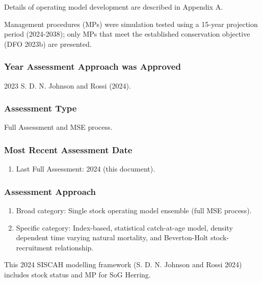 \documentclass[11pt]{book}
\begin{document}
Details of operating model development are described in Appendix A.

Management procedures (MPs) were simulation tested using a 15-year projection period (2024-2038); only MPs that meet the established conservation objective (DFO 2023b) are presented.

\hypertarget{year-assessment-approach-was-approved}{%
\subsubsection*{Year Assessment Approach was Approved}\label{year-assessment-approach-was-approved}}

2023 S. D. N. Johnson and Rossi (2024).

\hypertarget{assessment-type}{%
\subsubsection*{Assessment Type}\label{assessment-type}}

Full Assessment and MSE process.

\hypertarget{most-recent-assessment-date}{%
\subsubsection*{Most Recent Assessment Date}\label{most-recent-assessment-date}}
\begin{enumerate}
\def\labelenumi{\arabic{enumi}.}

\item
  Last Full Assessment: 2024 (this document).
\end{enumerate}
\hypertarget{assessment-approach}{%
\subsubsection*{Assessment Approach}\label{assessment-approach}}
\begin{enumerate}
\def\labelenumi{\arabic{enumi}.}
\item
  Broad category: Single stock operating model ensemble (full MSE process).
\item
  Specific category: Index-based, statistical catch-at-age model, density dependent time varying natural mortality, and Beverton-Holt stock-recruitment relationship.
\end{enumerate}
This 2024 SISCAH modelling framework (S. D. N. Johnson and Rossi 2024) includes stock status and MP for SoG Herring.
\end{document}
